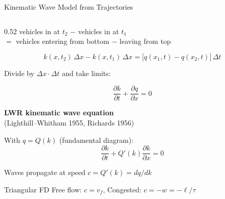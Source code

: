 \documentclass[11pt,aspectratio=169]{beamer}
\begin{document}
\begin{frame}{Kinematic Wave Model from Trajectories}
\begin{columns}[T]
\begin{column}{0.52\textwidth}
\vspace{0.3em}
{\small
vehicles in at $t_2$ $-$ vehicles in at $t_1$\\
$=$ vehicles entering from bottom $-$ leaving from top
}

\vspace{0.3em}
\[
k(x, t_2)\,\Delta x - k(x, t_1)\,\Delta x = \big[q(x_1, t) - q(x_2, t)\big]\,\Delta t
\]

\vspace{0.3em}
Divide by $\Delta x \cdot \Delta t$ and take limits:

\vspace{0.1em}
\[
\boxed{\frac{\partial k}{\partial t} + \frac{\partial q}{\partial x} = 0}
\]

\vspace{0.3em}
\textbf{LWR kinematic wave equation}\\[3pt]
{\scriptsize (Lighthill--Whitham 1955, Richards 1956)}

\vspace{0.5em}
With $q = Q(k)$ (fundamental diagram):
\[
\frac{\partial k}{\partial t} + Q'(k)\frac{\partial k}{\partial x} = 0
\]

{\small Waves propagate at speed $c = Q'(k) = dq/dk$}

\vspace{0.3em}
\begin{exampleblock}{\small Triangular FD}
{\scriptsize Free flow: $c = v_f$, \; Congested: $c = -w = -\ell/\tau$}
\end{exampleblock}
\end{column}
\end{columns}
\end{frame}
\end{document}
